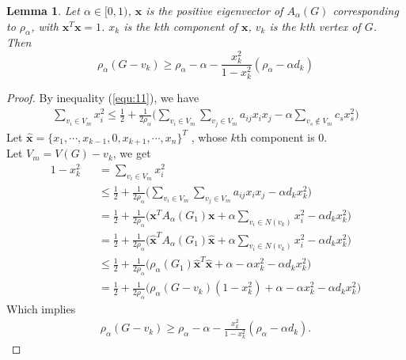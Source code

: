 \documentclass[amsthm]{elsart}
\newtheorem{lemma}{Lemma}[section]
\begin{document}
\begin{lemma} \label{lem:2}
Let $\alpha \in [0, 1)$, $\textbf{x}$ is the positive eigenvector of $A_\alpha (G)$ corresponding to $\rho _\alpha$, with $\textbf{x}^T \textbf{x} = 1$. $x_k$ is the $k$th component of $\textbf{x}$, $v_k$ is  the $k$th vertex of $G$. Then
\begin{equation} \label{equ:13}
\rho _\alpha (G - v_k)
    \geqslant \rho _\alpha - \alpha - \frac{x_k^2}{1 - x_k^2} (\rho _\alpha - \alpha d_k)
\end{equation}
\end{lemma}

\begin{proof}
By inequality (\ref{equ:11}), we have
\begin{eqnarray*}
\sum \limits_{v_i \in V_m}^{} x_i^2
\leqslant \frac{1}{2} + \frac{1}{2 \rho_\alpha} \Big( \sum \limits_{v_i \in V_m}^{} \sum \limits_{v_j \in V_m}^{} a_{ij} x_i x_j - \alpha \sum \limits_{v_s \notin V_m}^{} c_s x_s^2 \Big)
\end{eqnarray*}
Let $\hat{\textbf{x}} = \{x_1, \cdots, x_{k-1}, 0, x_{k+1}, \cdots, x_n\}^T$ , whose $k$th component is 0. \\
Let $V_m = V(G) - v_k$,  we get
\begin{eqnarray*}
1 - x_k^2
&&= \sum \limits_{v_i \in V_m}^{} x_i^2
\\ &&\leqslant \frac{1}{2} + \frac{1}{2 \rho_\alpha} \Big( \sum \limits_{v_i \in V_m}^{} \sum \limits_{v_j \in V_m}^{} a_{ij} x_i x_j - \alpha d_k x_k^2 \Big)
\\ &&= \frac{1}{2} + \frac{1}{2 \rho_\alpha} \Big( \textbf{x}^T A_\alpha(G_1) \textbf{x} + \alpha \sum \limits_{v_i \in N(v_k)}^{} x_i^2 - \alpha d_k x_k^2 \Big)
\\ &&= \frac{1}{2} + \frac{1}{2 \rho_\alpha} \Big( \hat{\textbf{x}}^T A_\alpha(G_1) \hat{\textbf{x}} + \alpha \sum \limits_{v_i \in N(v_k)}^{} x_i^2 - \alpha d_k x_k^2 \Big)
\\ &&\leqslant \frac{1}{2} + \frac{1}{2 \rho_\alpha} \Big( \rho_\alpha (G_1) \hat{\textbf{x}}^T \hat{\textbf{x}} + \alpha - \alpha  x_k^2 - \alpha d_k x_k^2 \Big)
\\ &&= \frac{1}{2} + \frac{1}{2 \rho_\alpha} \Big( \rho_\alpha (G - v_k) (1 - x_k^2) + \alpha - \alpha  x_k^2 - \alpha d_k x_k^2 \Big)
\end{eqnarray*}
Which implies
\begin{eqnarray*}
  \rho_\alpha (G - v_k) \geqslant \rho_\alpha - \alpha - \frac{x_k^2}{1 - x_k^2} ( \rho_\alpha - \alpha d_k).
\end{eqnarray*}
\end{proof}
\end{document}
